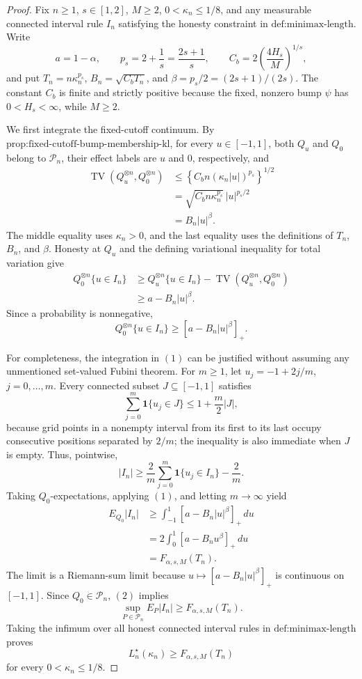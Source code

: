\documentclass{article}
\begin{document}
\begin{proof}
Fix \(n\ge1\), \(s\in[1,2]\), \(M\ge2\),
\(0<\kappa_n\le1/8\), and any measurable connected interval rule
\(I_n\) satisfying the honesty constraint in \(\text{def:minimax-length}\).
Write
\[
 a=1-\alpha,
 \qquad p_s=2+\frac1s=\frac{2s+1}{s},
 \qquad C_b=2\left(\frac{4H_s}{M}\right)^{1/s},
\]
and put \(T_n=n\kappa_n^{p_s}\),
\(B_n=\sqrt{C_bT_n}\), and \(\beta=p_s/2=(2s+1)/(2s)\).
The constant \(C_b\) is finite and strictly positive because the fixed,
nonzero bump \(\psi\) has \(0<H_s<\infty\), while \(M\ge2\).

We first integrate the fixed-cutoff continuum.  By
\(\text{prop:fixed-cutoff-bump-membership-kl}\), for every
\(u\in[-1,1]\), both \(Q_u\) and \(Q_0\) belong to \(\mathcal P_n\),
their effect labels are \(u\) and \(0\), respectively, and
\[
 \begin{aligned}
 \operatorname{TV}(Q_u^{\otimes n},Q_0^{\otimes n})
 &\le\left\{C_b n(\kappa_n|u|)^{p_s}\right\}^{1/2}\\
 &=\sqrt{C_bn\kappa_n^{p_s}}\,|u|^{p_s/2}\\
 &=B_n|u|^\beta.
 \end{aligned}
\]
The middle equality uses \(\kappa_n>0\), and the last equality uses the
definitions of \(T_n\), \(B_n\), and \(\beta\).  Honesty at \(Q_u\)
and the defining variational inequality for total variation give
\[
 \begin{aligned}
 Q_0^{\otimes n}\{u\in I_n\}
 &\ge Q_u^{\otimes n}\{u\in I_n\}
      -\operatorname{TV}(Q_u^{\otimes n},Q_0^{\otimes n})\\
 &\ge a-B_n|u|^\beta.
 \end{aligned}
\]
Since a probability is nonnegative,
\[
 Q_0^{\otimes n}\{u\in I_n\}
 \ge[a-B_n|u|^\beta]_+.
 \tag{1}
\]

For completeness, the integration in \((1)\) can be justified without
assuming any unmentioned set-valued Fubini theorem.  For \(m\ge1\), let
\(u_j=-1+2j/m\), \(j=0,\ldots,m\).  Every connected subset
\(J\subseteq[-1,1]\) satisfies
\[
 \sum_{j=0}^m\mathbf 1\{u_j\in J\}\le1+\frac m2|J|,
\]
because grid points in a nonempty interval from its first to its last
occupy consecutive positions separated by \(2/m\); the inequality is
also immediate when \(J\) is empty.  Thus, pointwise,
\[
 |I_n|\ge\frac2m\sum_{j=0}^m\mathbf 1\{u_j\in I_n\}-\frac2m.
\]
Taking \(Q_0\)-expectations, applying \((1)\), and letting
\(m\to\infty\) yield
\[
 \begin{aligned}
 E_{Q_0}|I_n|
 &\ge\int_{-1}^1[a-B_n|u|^\beta]_+\,du\\
 &=2\int_0^1[a-B_nu^\beta]_+\,du\\
 &=F_{\alpha,s,M}(T_n).
 \tag{2}
 \end{aligned}
\]
The limit is a Riemann-sum limit because
\(u\mapsto[a-B_n|u|^\beta]_+\) is continuous on \([-1,1]\).
Since \(Q_0\in\mathcal P_n\), \((2)\) implies
\[
 \sup_{P\in\mathcal P_n}E_P|I_n|\ge F_{\alpha,s,M}(T_n).
\]
Taking the infimum over all honest connected interval rules in
\(\text{def:minimax-length}\) proves
\[
 L_n^\star(\kappa_n)\ge F_{\alpha,s,M}(T_n)
\]
for every \(0<\kappa_n\le1/8\).


\end{proof}
\end{document}
